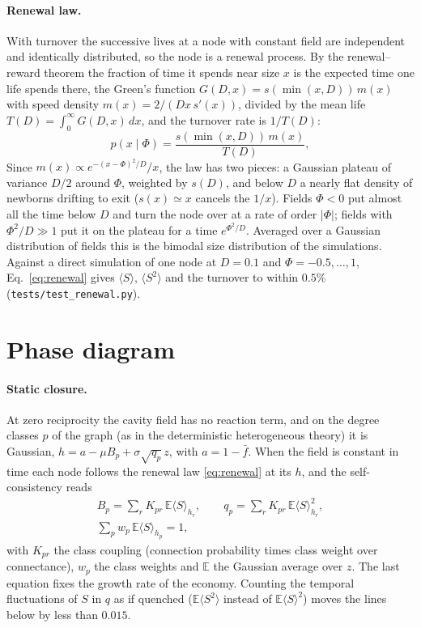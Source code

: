 \documentclass[pre,twocolumn,superscriptaddress,nofootinbib]{revtex4-2}
\newcommand{\E}{\mathbb E}
\begin{document}
\paragraph{Renewal law.}  With turnover the successive lives at a node with constant field are
independent and identically distributed, so the node is a renewal process.  By the renewal--reward
theorem the fraction of time it spends near size $x$ is the expected time one life spends there,
the Green's function $G(D,x)=s(\min(x,D))\,m(x)$ with speed density $m(x)=2/(Dx\,s'(x))$, divided by
the mean life $T(D)=\int_0^\infty G(D,x)\,dx$, and the turnover rate is $1/T(D)$:
\begin{equation}
p(x\mid\Phi)=\frac{s(\min(x,D))\,m(x)}{T(D)},
\label{eq:renewal}
\end{equation}
Since $m(x)\propto e^{-(x-\Phi)^2/D}/x$, the law has two pieces: a Gaussian plateau of variance $D/2$
around $\Phi$, weighted by $s(D)$, and below $D$ a nearly flat density of newborns drifting to exit
($s(x)\simeq x$ cancels the $1/x$).  Fields $\Phi<0$ put almost all the time below $D$ and turn
the node over at a rate of order $|\Phi|$; fields with $\Phi^2/D\gg1$ put it on the plateau for a time
$e^{\Phi^2/D}$.  Averaged over a Gaussian distribution of fields this is the bimodal size
distribution of the simulations.  Against a direct simulation of one node at $D=0.1$ and
$\Phi=-0.5,\dots,1$, Eq.~\eqref{eq:renewal} gives $\langle S\rangle$, $\langle S^2\rangle$ and the turnover to
within $0.5\%$ (\texttt{tests/test\_renewal.py}).

\section{Phase diagram}
\label{sec:phase}

\paragraph{Static closure.}  At zero reciprocity the cavity field has no reaction term, and on
the degree classes $p$ of the graph (as in the deterministic heterogeneous theory) it is Gaussian,
$h=a-\mu B_p+\sigma\sqrt{q_p}\,z$, with $a=1-\bar f$.  When the field is constant in time each node
follows the renewal law \eqref{eq:renewal} at its $h$, and the self-consistency reads
\begin{gather}
B_p=\sum_rK_{pr}\,\E\langle S\rangle_{h_r},\qquad q_p=\sum_rK_{pr}\,\E\langle S\rangle_{h_r}^2,\nonumber\\
\sum_pw_p\,\E\langle S\rangle_{h_p}=1,
\label{eq:static}
\end{gather}
with $K_{pr}$ the class coupling (connection probability times class weight over connectance),
$w_p$ the class weights and $\E$ the Gaussian average over $z$.  The last equation fixes the growth
rate of the economy.  Counting the temporal fluctuations of $S$ in $q$ as if quenched
($\E\langle S^2\rangle$ instead of $\E\langle S\rangle^2$) moves the lines below by less than $0.015$.
\end{document}
